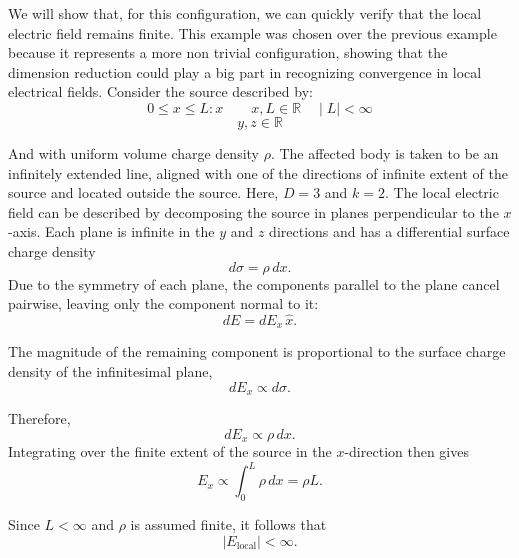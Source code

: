 \documentclass[12pt]{article}
\begin{document}
\begin{center}
\end{center}
We will show that, for this configuration, we can quickly verify that the local electric field remains finite. This example was chosen over the previous example because it represents a more non trivial configuration, showing that the dimension reduction could play a big part in recognizing convergence in local electrical fields.
Consider the source described by:
\[0\leq x \leq L:x\qquad x,L\in \mathbb{R} \quad \mid L\mid <\infty\]
\[y,z\in \mathbb{R}\]

And with uniform volume charge density $\rho$. The affected body is taken to be an infinitely extended line, aligned with one of the directions of infinite extent of the source and located outside the source. Here, $D=3$ and $k=2$.
The local electric field can be described by decomposing the source in planes perpendicular to the $x$-axis. Each plane is infinite in the $y$ and $z$ directions and has a differential surface charge density
\[
d\sigma=\rho\,dx.
\]
Due to the symmetry of each plane, the components parallel to the plane cancel pairwise, leaving only the component normal to it:
\[
dE=dE_x\,\hat{x}.
\]

The magnitude of the remaining component is proportional to the surface charge density of the infinitesimal plane,
\[
dE_x\propto d\sigma.
\]

Therefore,
\[
dE_x\propto \rho\,dx.
\]
Integrating over the finite extent of the source in the $x$-direction then gives
\[
E_x\propto \int_0^L \rho\,dx = \rho L.
\]

Since $L<\infty$ and $\rho$ is assumed finite, it follows that
\[
\boxed{|E_{\mathrm{local}}|<\infty}.
\]
\end{document}
